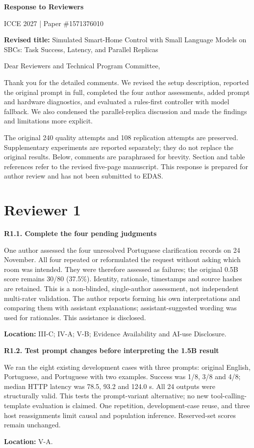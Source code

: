 \documentclass[11pt,a4paper]{article}
\newcommand{\point}[2]{\vspace{4pt}\textbf{#1. #2}\par}
\newcommand{\where}[1]{\par{\small\textcolor{ink}{\textbf{Location:} #1}}\par}
\begin{document}
{\LARGE\bfseries\color{ink}Response to Reviewers}\par
{\large ICCE 2027 | Paper \#1571376010}\par
\textbf{Revised title:} Simulated Smart-Home Control with Small Language Models on SBCs: Task Success, Latency, and Parallel Replicas

Dear Reviewers and Technical Program Committee,

Thank you for the detailed comments. We revised the setup description, reported the original prompt in full, completed the four author assessments, added prompt and hardware diagnostics, and evaluated a rules-first controller with model fallback. We also condensed the parallel-replica discussion and made the findings and limitations more explicit.

The original 240 quality attempts and 108 replication attempts are preserved. Supplementary experiments are reported separately; they do not replace the original results. Below, comments are paraphrased for brevity. Section and table references refer to the revised five-page manuscript. This response is prepared for author review and has not been submitted to EDAS.

\section*{Reviewer 1}
\point{R1.1}{Complete the four pending judgments}
One author assessed the four unresolved Portuguese clarification records on 24 November. All four repeated or reformulated the request without asking which room was intended. They were therefore assessed as failures; the original 0.5B score remains 30/80 (37.5\%). Identity, rationale, timestamps and source hashes are retained. This is a non-blinded, single-author assessment, not independent multi-rater validation. The author reports forming his own interpretations and comparing them with assistant explanations; assistant-suggested wording was used for rationales. This assistance is disclosed.
\where{III-C; IV-A; V-B; Evidence Availability and AI-use Disclosure.}

\point{R1.2}{Test prompt changes before interpreting the 1.5B result}
We ran the eight existing development cases with three prompts: original English, Portuguese, and Portuguese with two examples. Success was 1/8, 3/8 and 4/8; median HTTP latency was 78.5, 93.2 and 124.0 s. All 24 outputs were structurally valid. This tests the prompt-variant alternative; no new tool-calling-template evaluation is claimed. One repetition, development-case reuse, and three host reassignments limit causal and population inference. Reserved-set scores remain unchanged.
\where{V-A.}
\end{document}
